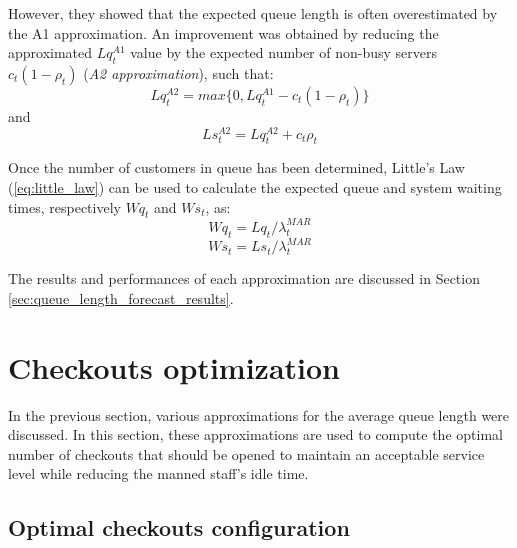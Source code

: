 However, they showed that the expected queue length is often overestimated by the A1 approximation. An improvement was obtained by reducing the approximated \( Lq_t^{A1} \) value by the expected number of non-busy servers \( c_t (1 - \rho_t) \) (\emph{A2 approximation}), such that:
\begin{equation}
  Lq_t^{A2} = max\{0, Lq_t^{A1} - c_t (1 - \rho_t)\}
\end{equation}
and
\begin{equation}
  Ls_t^{A2} = Lq_t^{A2} + c_t \rho_t
\end{equation}

Once the number of customers in queue has been determined, Little’s Law (\ref{eq:little_law})\cite{little} can be used to calculate the expected queue and system waiting times, respectively \( Wq_t \) and \( Ws_t \), as:
\begin{equation}
  Wq_t = Lq_t / \lambda^{MAR}_t
\end{equation}
\begin{equation}
  Ws_t = Ls_t / \lambda^{MAR}_t
\end{equation}

The results and performances of each approximation are discussed in Section \ref{sec:queue_length_forecast_results}.

\section{Checkouts optimization}
\label{sec:checkouts_optimization}

In the previous section, various approximations for the average queue length were discussed. In this section, these approximations are used to compute the optimal number of checkouts that should be opened to maintain an acceptable service level while reducing the manned staff’s idle time.

\subsection{Optimal checkouts configuration}
\label{subsec:optimal_checkouts_configuration}

